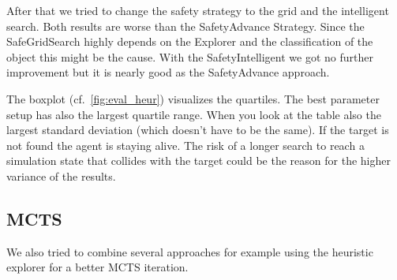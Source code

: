 After that we tried to change the safety strategy to the grid and the intelligent search. Both results
are worse than the SafetyAdvance Strategy. Since the SafeGridSearch highly depends on the Explorer and the
classification of the object this might be the cause.
With the SafetyIntelligent we got no further improvement but it is nearly good as the SafetyAdvance approach.

The boxplot (cf.~\cref{fig:eval_heur}) visualizes the quartiles. The best parameter setup has also the largest
quartile range. When you look at the table also the largest standard deviation (which doesn't have to be the same).
If the target is not found the agent is staying alive. The risk of a longer search to reach a simulation state
that collides with the target could be the reason for the higher variance of the results.



\subsection{MCTS} 
We also tried to combine several approaches for example using the heuristic explorer 
for a better \ac{MCTS} iteration. 


